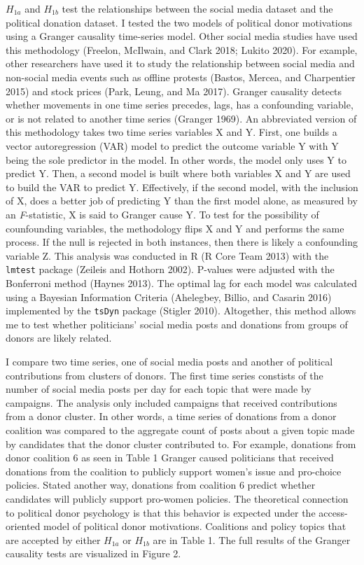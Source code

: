 \documentclass[12pt,]{article}
\begin{document}
\(H_{1a}\) and \(H_{1b}\) test the relationships between the social
media dataset and the political donation dataset. I tested the two
models of political donor motivations using a Granger causality
time-series model. Other social media studies have used this methodology
(Freelon, McIlwain, and Clark 2018; Lukito 2020). For example, other
researchers have used it to study the relationship between social media
and non-social media events such as offline protests (Bastos, Mercea,
and Charpentier 2015) and stock prices (Park, Leung, and Ma 2017).
Granger causality detects whether movements in one time series precedes,
lags, has a confounding variable, or is not related to another time
series (Granger 1969). An abbreviated version of this methodology takes
two time series variables X and Y. First, one builds a vector
autoregression (VAR) model to predict the outcome variable Y with Y
being the sole predictor in the model. In other words, the model only
uses Y to predict Y. Then, a second model is built where both variables
X and Y are used to build the VAR to predict Y. Effectively, if the
second model, with the inclusion of X, does a better job of predicting Y
than the first model alone, as measured by an \emph{F}-statistic, X is
said to Granger cause Y. To test for the possibility of counfounding
variables, the methodology flips X and Y and performs the same process.
If the null is rejected in both instances, then there is likely a
confounding variable Z. This analysis was conducted in R (R Core Team
2013) with the \texttt{lmtest} package (Zeileis and Hothorn 2002).
P-values were adjusted with the Bonferroni method (Haynes 2013). The
optimal lag for each model was calculated using a Bayesian Information
Criteria (Ahelegbey, Billio, and Casarin 2016) implemented by the
\texttt{tsDyn} package (Stigler 2010). Altogether, this method allows me
to test whether politicians' social media posts and donations from
groups of donors are likely related.

I compare two time series, one of social media posts and another of
political contributions from clusters of donors. The first time series
constists of the number of social media posts per day for each topic
that were made by campaigns. The analysis only included campaigns that
received contributions from a donor cluster. In other words, a time
series of donations from a donor coalition was compared to the aggregate
count of posts about a given topic made by candidates that the donor
cluster contributed to. For example, donations from donor coalition 6 as
seen in Table 1 Granger caused politicians that received donations from
the coalition to publicly support women's issue and pro-choice policies.
Stated another way, donations from coalition 6 predict whether
candidates will publicly support pro-women policies. The theoretical
connection to political donor psychology is that this behavior is
expected under the access-oriented model of political donor motivations.
Coalitions and policy topics that are accepted by either \(H_{1a}\) or
\(H_{1b}\) are in Table 1. The full results of the Granger causality
tests are visualized in Figure 2.
\end{document}
